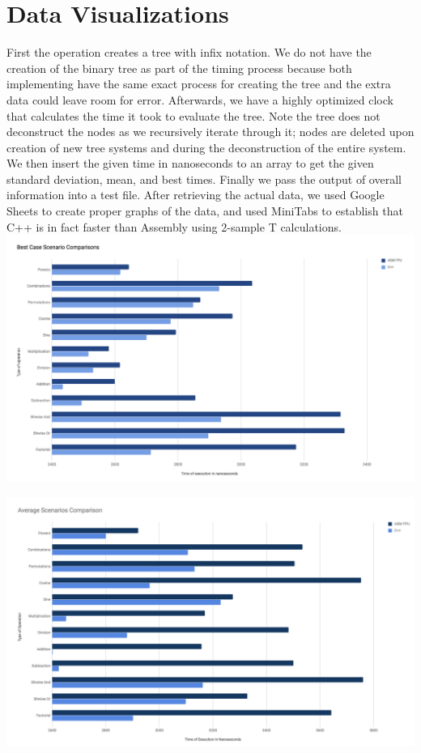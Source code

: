 \documentclass[a4paper,10pt]{article}
\begin{document}
\section*{Data Visualizations}
\smallskip
First the operation creates a tree with infix notation. We do not have the creation of the binary tree as part of the timing process because both implementing have the same exact process for creating the tree and the extra data could leave room for error. Afterwards, we have a highly optimized clock that calculates the time it took to evaluate the tree. Note the tree does not deconstruct the nodes as we recursively iterate through it; nodes are deleted upon creation of new tree systems and during the deconstruction of the entire system. We then insert the given time in nanoseconds to an array to get the given standard deviation, mean, and best times. Finally we pass the output of overall information into a test file. After retrieving the actual data, we used Google Sheets to create proper graphs of the data, and used MiniTabs to establish that C++ is in fact faster than Assembly using 2-sample T calculations.
\smallskip
\hfill\includegraphics[width=190mm]{images/Best Case Scenario.png}\hspace*{\fill}

\hfill\includegraphics[width=190mm]{images/Average Best Case.png}\hspace*{\fill}
\end{document}

